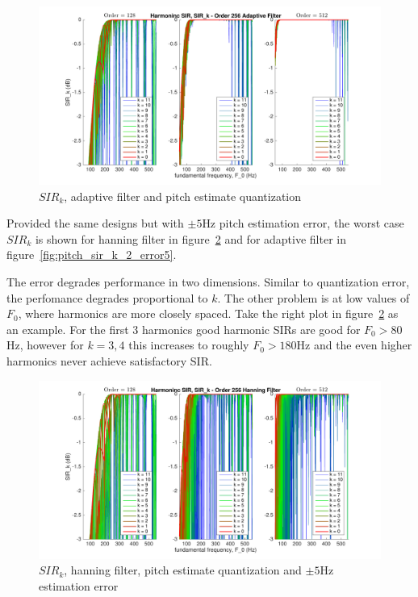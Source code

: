 \documentclass [11pt, proquest,oneside] {ganter_thesis}[2015/03/03]
\begin{document}
\begin{figure}[!ht]
  \centering
    \includegraphics[width=1\textwidth]{pitch_sir_k_2}
    \caption{$SIR_k$, adaptive filter and pitch estimate quantization}\label{fig:pitch_sir_k_2}
\end{figure}

Provided the same designs but with $\pm5$Hz pitch estimation error, the worst case $SIR_k$ is shown for hanning filter in figure~\ref{fig:pitch_sir_k_1_error5} and for adaptive filter in figure~\ref{fig:pitch_sir_k_2_error5}.

The error degrades performance in two dimensions.  Similar to quantization error, the perfomance degrades proportional to $k$.  The other problem is at low values of $F_0$, where harmonics are more closely spaced.  Take the right plot in figure~\ref{fig:pitch_sir_k_1_error5} as an example.  For the first 3 harmonics good harmonic SIRs are good for $F_0 > 80$Hz, however for $k = 3,4$ this increases to roughly $F_0 > 180$Hz and the even higher harmonics never achieve satisfactory SIR.

\begin{figure}[!ht]
  \centering
    \includegraphics[width=1\textwidth]{pitch_sir_k_1_error5}
    \caption{$SIR_k$, hanning filter, pitch estimate quantization and $\pm5$Hz estimation error}\label{fig:pitch_sir_k_1_error5}
\end{figure}
\end{document}
